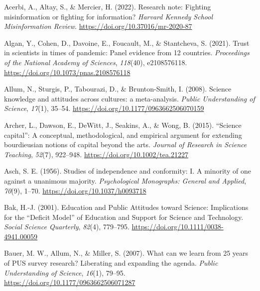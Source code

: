 \documentclass[
  jou,
  floatsintext,
  longtable,
  nolmodern,
  notxfonts,
  notimes,
  colorlinks=true,linkcolor=blue,citecolor=blue,urlcolor=blue]{apa7}
\newlength{\cslhangindent}
\newenvironment{CSLReferences}[2] %
 {\begin{list}{}{%
  \setlength{\itemindent}{0pt}
  \setlength{\leftmargin}{0pt}
  \setlength{\parsep}{0pt}
  \ifodd #1
   \setlength{\leftmargin}{\cslhangindent}
   \setlength{\itemindent}{-1\cslhangindent}
  \fi
  \setlength{\itemsep}{#2\baselineskip}}}
 {\end{list}}
\begin{document}
\label{refs}
\begin{CSLReferences}{1}{0}
Acerbi, A., Altay, S., \& Mercier, H. (2022). Research note: Fighting
misinformation or fighting for information? \emph{Harvard Kennedy School
Misinformation Review}. \url{https://doi.org/10.37016/mr-2020-87}

Algan, Y., Cohen, D., Davoine, E., Foucault, M., \& Stantcheva, S.
(2021). Trust in scientists in times of pandemic: Panel evidence from 12
countries. \emph{Proceedings of the National Academy of Sciences},
\emph{118}(40), e2108576118.
\url{https://doi.org/10.1073/pnas.2108576118}

Allum, N., Sturgis, P., Tabourazi, D., \& Brunton-Smith, I. (2008).
Science knowledge and attitudes across cultures: a meta-analysis.
\emph{Public Understanding of Science}, \emph{17}(1), 35--54.
\url{https://doi.org/10.1177/0963662506070159}

Archer, L., Dawson, E., DeWitt, J., Seakins, A., \& Wong, B. (2015).
{``}Science capital{''}: A conceptual, methodological, and empirical
argument for extending bourdieusian notions of capital beyond the arts.
\emph{Journal of Research in Science Teaching}, \emph{52}(7), 922--948.
\url{https://doi.org/10.1002/tea.21227}

Asch, S. E. (1956). Studies of independence and conformity: I. A
minority of one against a unanimous majority. \emph{Psychological
Monographs: General and Applied}, \emph{70}(9), 1--70.
\url{https://doi.org/10.1037/h0093718}

Bak, H.-J. (2001). Education and Public Attitudes toward Science:
Implications for the {``}Deficit Model{''} of Education and Support for
Science and Technology. \emph{Social Science Quarterly}, \emph{82}(4),
779--795. \url{https://doi.org/10.1111/0038-4941.00059}

Bauer, M. W., Allum, N., \& Miller, S. (2007). What can we learn from 25
years of PUS survey research? Liberating and expanding the agenda.
\emph{Public Understanding of Science}, \emph{16}(1), 79--95.
\url{https://doi.org/10.1177/0963662506071287}


\end{CSLReferences}
\end{document}
